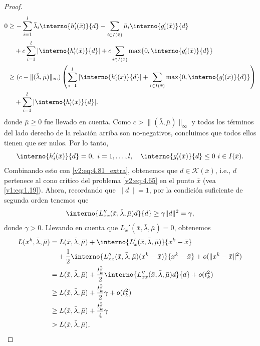 \begin{proof}
    \begin{align*}
        0 &\ge -\sum_{i=1}^l \bar{\lambda}_i \interno{h_i'(\bar{x})}{d} - \sum_{i \in I(\bar{x})} \bar{\mu}_i \interno{g_i'(\bar{x})}{d} \\
        &\quad + c\sum_{i=1}^l |\interno{h_i'(\bar{x})}{d}| + c \sum_{i \in I(\bar{x})} \max\{0, \interno{g_i'(\bar{x})}{d}\} \\
        &\ge (c - \|(\bar{\lambda}, \bar{\mu})\|_\infty) \left( \sum_{i=1}^l |\interno{h_i'(\bar{x})}{d}| + \sum_{i \in I(\bar{x})} \max\{0, \interno{g_i'(\bar{x})}{d}\} \right) \\
        &\quad + \sum_{i=1}^l |\interno{h_i'(\bar{x})}{d}|.
    \end{align*}
    donde $\bar{\mu} \ge 0$ fue llevado en cuenta. Como $c > \|(\bar{\lambda}, \bar{\mu})\|_\infty$ y todos los términos del lado derecho de la relación arriba son no-negativos, concluimos que todos ellos tienen que ser nulos. Por lo tanto,
    \[
        \interno{h_i'(\bar{x})}{d} = 0, \ i = 1, \dots, l, \quad \interno{g_i'(\bar{x})}{d} \le 0 \ i \in I(\bar{x}).
    \]
    Combinando esto con \eqref{v2:eq:4.81_extra}, obtenemos que $d \in \mathcal{K}(\bar{x})$, i.e., $d$ pertenece al cono crítico del problema \eqref{v2:eq:4.65} en el punto $\bar{x}$ (vea \eqref{v1:eq:1.19}). Ahora, recordando que $\|d\| = 1$, por la condición suficiente de segunda orden tenemos que
    \[
        \interno{L_{xx}''(\bar{x}, \bar{\lambda}, \bar{\mu})d}{d} \ge \gamma \|d\|^2 = \gamma,
    \]
    donde $\gamma > 0$.
    Llevando en cuenta que $L_x'(\bar{x}, \bar{\lambda}, \bar{\mu}) = 0$, obtenemos
    \begin{align}
        L(x^k, \bar{\lambda}, \bar{\mu}) &= L(\bar{x}, \bar{\lambda}, \bar{\mu}) + \interno{L_x'(\bar{x}, \bar{\lambda}, \bar{\mu})}{x^k - \bar{x}} \nonumber \\
        &\quad + \frac{1}{2} \interno{L_{xx}''(\bar{x}, \bar{\lambda}, \bar{\mu})(x^k - \bar{x})}{x^k - \bar{x}} + o(\|x^k - \bar{x}\|^2) \nonumber \\
        &= L(\bar{x}, \bar{\lambda}, \bar{\mu}) + \frac{t_k^2}{2} \interno{L_{xx}''(\bar{x}, \bar{\lambda}, \bar{\mu})d}{d} + o(t_k^2) \nonumber \\
        &\ge L(\bar{x}, \bar{\lambda}, \bar{\mu}) + \frac{t_k^2}{2} \gamma + o(t_k^2) \nonumber \\
        &\ge L(\bar{x}, \bar{\lambda}, \bar{\mu}) + \frac{t_k^2}{4} \gamma \nonumber \\
        &> L(\bar{x}, \bar{\lambda}, \bar{\mu}), \label{v2:eq:4.82}

\end{align}
\end{proof}
